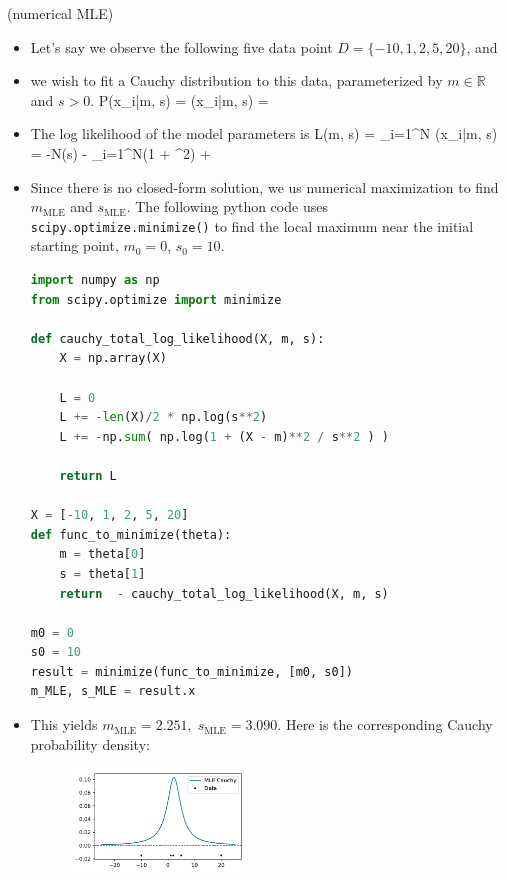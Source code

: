 \newpage
{} (numerical MLE)
\begin{itemize}
	\item Let's say we observe the following five data point $D = \{-10, 1, 2, 5, 20\}$, and
	\item we wish to fit a Cauchy distribution to this data, parameterized by $m \in \mathds{R}$ and $s > 0$.
	\be
		P(x_i\;|\;m, s) = (x_i\;|\;m, s) =  
	\ee
	\item The log likelihood of the model parameters is
		\be
			L(m, s) = \sum_{i=1}^N \log {}(x_i\;|\;m, s) = -N\log(s) - \sum_{i=1}^N\log\!\left(1 + ^2\right) + 
		\ee

	\item Since there is no closed-form solution, we us numerical maximization to find $m_\text{MLE}$ and $s_\text{MLE}$. The following python code uses \texttt{scipy.optimize.minimize()} to find the local maximum near the initial starting point, $m_0 = 0$, $s_0 = 10$.
\begin{lstlisting}[language=python]
import numpy as np
from scipy.optimize import minimize

def cauchy_total_log_likelihood(X, m, s):
    X = np.array(X)
    
    L = 0
    L += -len(X)/2 * np.log(s**2)
    L += -np.sum( np.log(1 + (X - m)**2 / s**2 ) )
    
    return L

X = [-10, 1, 2, 5, 20]
def func_to_minimize(theta):
    m = theta[0]
    s = theta[1]
    return  - cauchy_total_log_likelihood(X, m, s)

m0 = 0
s0 = 10
result = minimize(func_to_minimize, [m0, s0])
m_MLE, s_MLE = result.x
\end{lstlisting}
	\item This yields $m_\text{MLE} = 2.251, \; s_\text{MLE} = 3.090$. Here is the corresponding Cauchy probability density:
		\begin{figure}[h]
			\centering
			\includegraphics[width=0.44\textwidth]{./figs/Cauchy_MLE.pdf}
		\end{figure}
\end{itemize}


